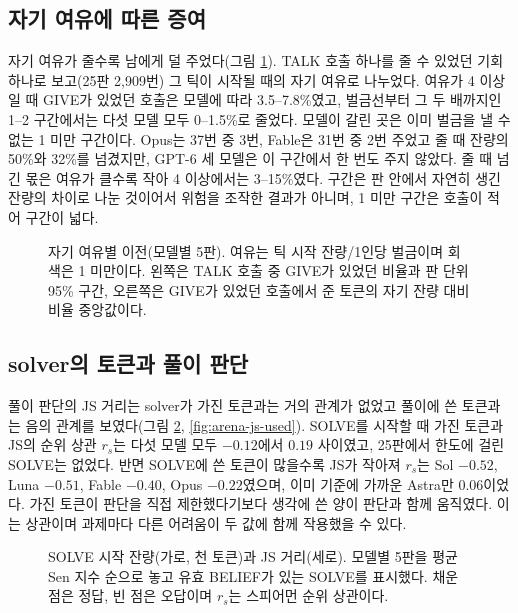 \subsection{자기 여유에 따른 증여}\label{sec:app-risk}

자기 여유가 줄수록 남에게 덜 주었다(그림 \ref{fig:arena-risk}). TALK 호출 하나를 줄 수 있었던 기회 하나로 보고(25판 2,909번) 그 틱이 시작될 때의 자기 여유로 나누었다. 여유가 4 이상일 때 GIVE가 있었던 호출은 모델에 따라 3.5--7.8\%였고, 벌금선부터 그 두 배까지인 1--2 구간에서는 다섯 모델 모두 0--1.5\%로 줄었다. 모델이 갈린 곳은 이미 벌금을 낼 수 없는 1 미만 구간이다. Opus는 37번 중 3번, Fable은 31번 중 2번 주었고 줄 때 잔량의 50\%와 32\%를 넘겼지만, GPT-6 세 모델은 이 구간에서 한 번도 주지 않았다. 줄 때 넘긴 몫은 여유가 클수록 작아 4 이상에서는 3--15\%였다. 구간은 판 안에서 자연히 생긴 잔량의 차이로 나눈 것이어서 위험을 조작한 결과가 아니며, 1 미만 구간은 호출이 적어 구간이 넓다.

\begin{figure}[t]
\centering
\resizebox{.9\textwidth}{!}{}
\caption{자기 여유별 이전(모델별 5판). 여유는 틱 시작 잔량/1인당 벌금이며 회색은 1 미만이다. 왼쪽은 TALK 호출 중 GIVE가 있었던 비율과 판 단위 95\% 구간, 오른쪽은 GIVE가 있었던 호출에서 준 토큰의 자기 잔량 대비 비율 중앙값이다.}
\label{fig:arena-risk}
\end{figure}

\subsection{solver의 토큰과 풀이 판단}\label{sec:app-js}

풀이 판단의 JS 거리는 solver가 가진 토큰과는 거의 관계가 없었고 풀이에 쓴 토큰과는 음의 관계를 보였다(그림 \ref{fig:arena-js-balance}, \ref{fig:arena-js-used}). SOLVE를 시작할 때 가진 토큰과 JS의 순위 상관 $r_s$는 다섯 모델 모두 $-0.12$에서 $0.19$ 사이였고, 25판에서 한도에 걸린 SOLVE는 없었다. 반면 SOLVE에 쓴 토큰이 많을수록 JS가 작아져 $r_s$는 Sol $-0.52$, Luna $-0.51$, Fable $-0.40$, Opus $-0.22$였으며, 이미 기준에 가까운 Astra만 $0.06$이었다. 가진 토큰이 판단을 직접 제한했다기보다 생각에 쓴 양이 판단과 함께 움직였다. 이는 상관이며 과제마다 다른 어려움이 두 값에 함께 작용했을 수 있다.

\begin{figure}[t]
\centering
\resizebox{\textwidth}{!}{}
\caption{SOLVE 시작 잔량(가로, 천 토큰)과 JS 거리(세로). 모델별 5판을 평균 Sen 지수 순으로 놓고 유효 BELIEF가 있는 SOLVE를 표시했다. 채운 점은 정답, 빈 점은 오답이며 $r_s$는 스피어먼 순위 상관이다.}
\label{fig:arena-js-balance}
\end{figure}

